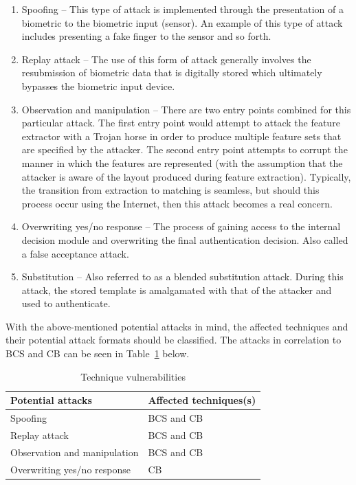     \begin{enumerate}[label=\roman*.]
    
        \item Spoofing – This type of attack is implemented through the presentation of a   biometric to the biometric input (sensor). An example of this type of attack includes presenting a fake finger to the sensor and so forth.
        \item Replay attack – The use of this form of attack generally involves the resubmission of biometric data that is digitally stored which ultimately bypasses the biometric input device.
        \item Observation and manipulation – There are two entry points combined for this particular attack. The first entry point would attempt to attack the feature extractor with a Trojan horse in order to produce multiple feature sets that are specified by the attacker. The second entry point attempts to corrupt the manner in which the features are represented (with the assumption that the attacker is aware of the layout produced during feature extraction). Typically, the transition from extraction to matching is seamless, but should this process occur using the Internet, then this attack becomes a real concern.
        \item Overwriting yes/no response – The process of gaining access to the internal decision module and overwriting the final authentication decision. Also called a false acceptance attack.
        \item Substitution – Also referred to as a blended substitution attack. During this attack, the stored template is amalgamated with that of the attacker and used to authenticate.

    \end{enumerate}
    
    With the above-mentioned potential attacks in mind, the affected techniques and their potential attack formats should be classified. The attacks in correlation to BCS and CB can be seen in Table~\ref{table:Technique vulnerabilities} below.
    
    
    \begin{table}[h]
    \caption{Technique vulnerabilities}
    \centering
     \begin{tabular}{|p{} | p{}|} 
     \hline
    	\textbf{Potential attacks} & \textbf{Affected techniques(s)} \\ [1ex] 
     \hline\hline 
     Spoofing & BCS and CB  \\[1ex]
     \hline 
     Replay attack & BCS and CB \\[1ex]
     \hline
     Observation and manipulation & BCS and CB\\[1ex]
     \hline           
     Overwriting yes/no response & CB\\[1ex]
     \hline
     \end{tabular}
     \label{table:Technique vulnerabilities}
    \end{table}
    
